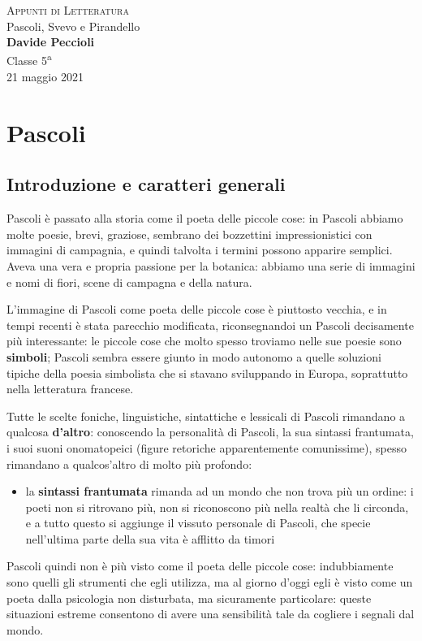 \documentclass[a4paper, twoside, titlepage]{book}
\newcommand{\elenco}[1]{%
\begin{itemize}
#1
\end{itemize}}
\begin{document}
\begin{titlepage} %
\begin{center}
    \null
    \vfill
    {\huge \textsc{Appunti di Letteratura}}\\
    \vspace{2em}
    {\Large Pascoli, Svevo e Pirandello}\\
    \vspace{3em}
    {\large \textbf{Davide Peccioli}}\\
    \vspace{1em}
    {\large Classe 5\textsuperscript{a}\\\vspace{0.4em} 21 maggio 2021}
    \fancyfoot[C]{}
    \vfill
\end{center}
\end{titlepage}
\tableofcontents

\part{Pascoli}

\chapter{Introduzione e caratteri generali}

Pascoli è passato alla storia come il poeta delle piccole cose: in Pascoli abbiamo molte poesie, brevi, graziose, sembrano dei bozzettini impressionistici con immagini di campagnia, e quindi talvolta i termini possono apparire semplici.
Aveva una vera e propria passione per la botanica: abbiamo una serie di immagini e nomi di fiori, scene di campagna e della natura.

L'immagine di Pascoli come poeta delle piccole cose è piuttosto vecchia, e in tempi recenti è stata parecchio modificata, riconsegnandoi un Pascoli decisamente più interessante: le piccole cose che molto spesso troviamo nelle sue poesie sono \textbf{simboli}; Pascoli sembra essere giunto in modo autonomo a quelle soluzioni tipiche della poesia simbolista che si stavano sviluppando in Europa, soprattutto nella letteratura francese.

Tutte le scelte foniche, linguistiche, sintattiche e lessicali di Pascoli rimandano a qualcosa \textbf{d'altro}: conoscendo la personalità di Pascoli, la sua sintassi frantumata, i suoi suoni onomatopeici (figure retoriche apparentemente comunissime), spesso rimandano a qualcos'altro di molto più profondo:
\elenco{\item la \textbf{sintassi frantumata} rimanda ad un mondo che non trova più un ordine: i poeti non si ritrovano più, non si riconoscono più nella realtà che li circonda, e a tutto questo si aggiunge il vissuto personale di Pascoli, che specie nell'ultima parte della sua vita è afflitto da timori}
Pascoli quindi non è più visto come il poeta delle piccole cose: indubbiamente sono quelli gli strumenti che egli utilizza, ma al giorno d'oggi egli è visto come un poeta dalla psicologia non disturbata, ma sicuramente particolare: queste situazioni estreme consentono di avere una sensibilità tale da cogliere i segnali dal mondo.
\end{document}

